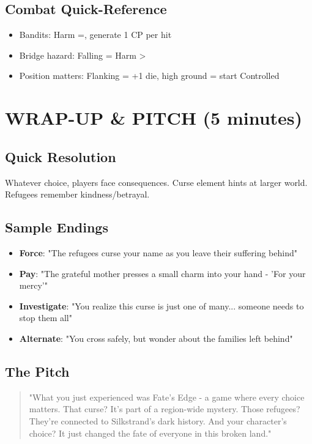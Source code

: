 \documentclass[11pt]{article}
\begin{document}
\subsection*{Combat Quick-Reference}
\begin{itemize}
\item Bandits: Harm =, generate 1 CP per hit
\item Bridge hazard: Falling = Harm >
\item Position matters: Flanking = +1 die, high ground = start Controlled
\end{itemize}

\section{WRAP-UP \& PITCH (5 minutes)}

\subsection*{Quick Resolution}
Whatever choice, players face consequences. Curse element hints at larger world. Refugees remember kindness/betrayal.

\subsection*{Sample Endings}
\begin{itemize}
\item \textbf{Force}: "The refugees curse your name as you leave their suffering behind"
\item \textbf{Pay}: "The grateful mother presses a small charm into your hand - 'For your mercy'"
\item \textbf{Investigate}: "You realize this curse is just one of many... someone needs to stop them all"
\item \textbf{Alternate}: "You cross safely, but wonder about the families left behind"
\end{itemize}

\subsection*{The Pitch}
\begin{quote}
"What you just experienced was Fate's Edge - a game where every choice matters. That curse? It's part of a region-wide mystery. Those refugees? They're connected to Silkstrand's dark history. And your character's choice? It just changed the fate of everyone in this broken land."
\end{quote}
\end{document}
